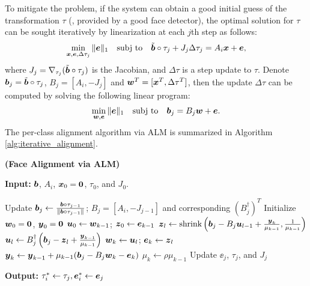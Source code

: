 \documentclass[10pt,twocolumn,letterpaper]{article}
\begin{document}
To mitigate the problem, if the system can obtain a good initial guess of the
transformation $\tau$ (\eg, provided by a good face detector), the optimal
solution for $\tau$ can be sought iteratively by linearization at each $j$th
step as follows:
\begin{equation}
\min_{{\boldsymbol{x}}, {\boldsymbol{e}}, \Delta \tau_j}\|{\boldsymbol{e}}\|_1\quad \textup{subj to}\quad \tilde{{\boldsymbol{b}}}\circ\tau_j +  J_j\Delta \tau_j = A_i{\boldsymbol{x}} + {\boldsymbol{e}},
\end{equation}
where $J_j = \nabla_{\tau_j}(\tilde{{\boldsymbol{b}}}\circ\tau_j)$ is the Jacobian, and
$\Delta \tau$ is a step update to $\tau$. Denote ${\boldsymbol{b}}_j =
\tilde{{\boldsymbol{b}}}\circ\tau_j$, $B_j = [A_i, -J_j]$ and ${\boldsymbol{w}}^T = [{\boldsymbol{x}}^T, \Delta
\tau^T]$, then the update $\Delta \tau$ can be computed by solving the
following linear program:
\begin{equation}
\min_{{\boldsymbol{w}}, {\boldsymbol{e}}}\|{\boldsymbol{e}}\|_1\quad \textup{subj to}\quad {\boldsymbol{b}}_j = B_j{\boldsymbol{w}} + {\boldsymbol{e}}.
\label{eq:alignment-linearization}
\end{equation}
The per-class alignment algorithm via ALM is summarized in Algorithm
\ref{alg:iterative_alignment}. 
\begin{algorithm}[ht!]
\caption{\bf (Face Alignment via ALM)} \label{alg:iterative_alignment}
{\bf Input:} ${\boldsymbol{b}}$, $A_i$, ${\boldsymbol{x}}_0 = \boldsymbol{0}$, $\tau_0$, and $J_0$.
\begin{algorithmic}[1]
\STATE Update ${\boldsymbol{b}}_j \leftarrow \frac{{\boldsymbol{b}}\circ \tau_{j-1}}{\|{\boldsymbol{b}}\circ \tau_{j-1}\|}$; $B_j= [A_i, -J_{j-1}]$ and corresponding $(B_j^\dagger)^T$
\STATE Initialize ${\boldsymbol{w}}_0 = \boldsymbol 0$, ${\boldsymbol{y}}_0 = \boldsymbol 0$
\STATE ${\boldsymbol{u}}_0\leftarrow {\boldsymbol{w}}_{k-1}$; ${\boldsymbol{z}}_0\leftarrow {\boldsymbol{e}}_{k-1}$
\STATE ${\boldsymbol{z}}_l \leftarrow \mbox{shrink}\left({\boldsymbol{b}}_j - B_j{\boldsymbol{u}}_{l-1} + \frac{{\boldsymbol{y}}_{k}}{\mu_{k-1}}, \frac{1}{\mu_{k-1}}\right)$
\STATE ${\boldsymbol{u}}_l \leftarrow B_j^\dagger \left({\boldsymbol{b}}_j - {\boldsymbol{z}}_{l} + \frac{{\boldsymbol{y}}_{k-1}}{\mu_{k-1}} \right) $
\ENDWHILE
\STATE ${\boldsymbol{w}}_k \leftarrow {\boldsymbol{u}}_l$; ${\boldsymbol{e}}_k \leftarrow {\boldsymbol{z}}_l$
\STATE ${\boldsymbol{y}}_{k} \leftarrow {\boldsymbol{y}}_{k-1} + \mu_{k-1} ({\boldsymbol{b}}_j - B_j{\boldsymbol{w}}_{k} - \boldsymbol{e}_{k})$
\STATE $\mu_{k} \leftarrow \rho\mu_{k-1}$
\ENDWHILE
\STATE Update $\ee_j$, $\tau_j$, and $J_j$
\ENDWHILE
\end{algorithmic}
{\bf Output:} $\tau_i^*\leftarrow \tau_j, \boldsymbol{e}_i^*\leftarrow {\boldsymbol{e}}_j$
\end{algorithm}
\end{document}
